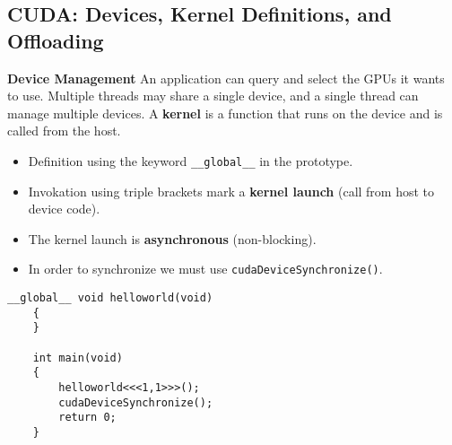 \subsection{CUDA: Devices, Kernel Definitions, and Offloading}
\textbf{Device Management}
An application can query and select the GPUs it wants to use.
Multiple threads may share a single device, and a single thread can manage multiple devices.
A \textbf{kernel} is a function that runs on the device and is called from the host.
\begin{itemize}
    \item Definition using the keyword \texttt{\_\_global\_\_} in the prototype.
    \item Invokation using triple brackets mark a \textbf{kernel launch} (call from host to device code).
    \item The kernel launch is \textbf{asynchronous} (non-blocking).
    \item In order to synchronize we must use \texttt{cudaDeviceSynchronize()}.
\end{itemize}
\begin{lstlisting}[style=cuda,caption={Example of a kernel definition and call.}]
    __global__ void helloworld(void)
    {
    }

    int main(void)
    {
        helloworld<<<1,1>>>();
        cudaDeviceSynchronize();
        return 0;
    }
\end{lstlisting}
